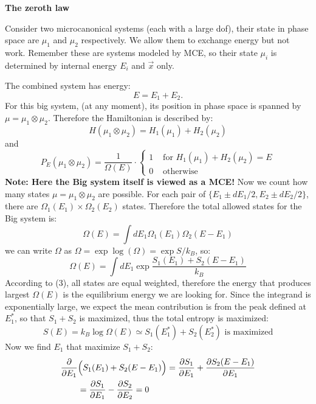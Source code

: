 \documentclass{article}
\begin{document}
\textbf{The zeroth law}

Consider two microcanonical systems (each with a large dof), their state in phase space are $\mu_1$ and  $\mu_2$ respectively. We allow them to exchange energy but not work. Remember these are systems modeled by MCE, so their state  $\mu_i$ is determined by internal energy $E_i$ and  $\vec{x}$ only. 

The combined system has energy:
\[
E = E_1 + E_2
.\] 
For this big system, (at any moment), its position in phase space is spanned by $\mu = \mu_1 \otimes \mu_2$. Therefore the Hamiltonian is described by:
\begin{equation}
	H(\mu_1 \otimes \mu_2) = H_1(\mu_1) + H_2(\mu_2)
\end{equation}
and
\begin{equation}
	P_E(\mu_1 \otimes \mu_2) = \frac{1}{\Omega(E)}\cdot
	\begin{cases}
		1 & \text{ for } H_1(\mu_1) + H_2(\mu_2) = E \\
		0 & \text{ otherwise}
	\end{cases}
\end{equation}
\textbf{Note: Here the Big system itself is viewed as a MCE!} Now we count how many states $\mu = \mu_1 \otimes \mu_2$ are possible. For each pair of  $\{E_1 \pm dE_1/2, E_2\pm dE_2/2\}$, there are  $\Omega_1(E_1)\times\Omega_2(E_2)$ states.  Therefore the total allowed states for the Big system is:
\begin{equation}
	\Omega(E) = \int dE_1 \Omega_1(E_1)\Omega_2(E-E_1)
\end{equation}
we can write $\Omega$ as  $\Omega = \exp{\log(\Omega)} = \exp{S/k_B}$, so:
 \begin{equation}
	 \Omega(E) = \int dE_1 \exp{\frac{S_1(E_1)+S_2(E-E_1)}{k_B}}
\end{equation}
According to (3), all states are equal weighted, therefore the energy that produces largest $\Omega(E)$ is the equilibrium energy we are looking for. Since the integrand is exponentially large, we expect the mean contribution is from the peak defined at $E_1^*$, so that  $S_1 + S_2$ is maximized, thus the total entropy is maximized:
 \begin{equation}
	 S(E) = k_B \log\Omega(E) \simeq S_1(E_1^*) + S_2(E_2^*) \text{ is maximized}
\end{equation}
Now we find $E_1$ that maximize  $S_1 + S_2$:
\begin{equation}
\begin{split}
	\frac{\partial }{\partial E_1}&\Bigl( S_1(E_1) + S_2(E-E_1) \Bigr)
	 = \frac{\partial S_1}{\partial E_1} + \frac{\partial S_2(E-E_1)}{\partial E_1}\\
				      &=\frac{\partial S_1}{\partial E_1} - \frac{\partial S_2}{\partial E_2} = 0
\end{split}
\end{equation}
\end{document}
